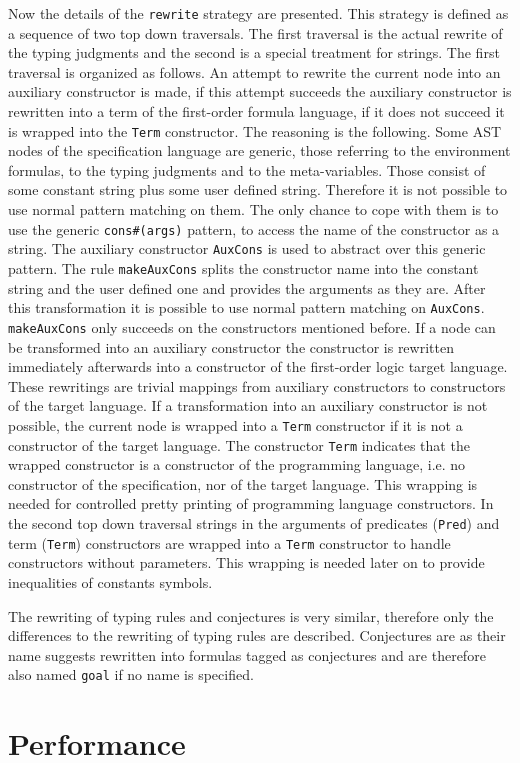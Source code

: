 Now the details of the \texttt{rewrite} strategy are presented. This
strategy is defined as a sequence of two top down traversals. The first
traversal is the actual rewrite of the typing judgments and the second
is a special treatment for strings. The first traversal is organized
as follows. An attempt to rewrite the current node into an auxiliary
constructor is made, if this attempt succeeds the auxiliary
constructor is rewritten into a term of the first-order formula
language, if it does not succeed it is wrapped into the \texttt{Term}
constructor. The reasoning is the following. Some AST nodes of the
specification language are generic, those referring to the environment
formulas, to the typing judgments and to the meta-variables. Those
consist of some constant string plus some user defined
string. Therefore it is not possible to use normal pattern matching on
them. The only chance to cope with them is to use the generic
\texttt{cons\#(args)} pattern, to access the name of the constructor
as a string. The auxiliary constructor \texttt{AuxCons} is used to
abstract over this generic pattern. The rule \texttt{makeAuxCons}
splits the constructor name into the constant string and the user
defined one and provides the arguments as they are. After this
transformation it is possible to use normal pattern matching on
\texttt{AuxCons}. \texttt{makeAuxCons} only succeeds on the
constructors mentioned before. If a node can be transformed into an
auxiliary constructor the constructor is rewritten immediately
afterwards into a constructor of the first-order logic target
language. These rewritings are trivial mappings from auxiliary
constructors to constructors of the target language. If a
transformation into an auxiliary constructor is not possible, the
current node is wrapped into a \texttt{Term} constructor if it is not
a constructor of the target language. The constructor \texttt{Term}
indicates that the wrapped constructor is a constructor of the
programming language, i.e. no constructor of the specification, nor of
the target language. This wrapping is needed for controlled pretty
printing of programming language constructors. In the second top down
traversal strings in the arguments of predicates (\texttt{Pred}) and
term (\texttt{Term}) constructors are wrapped into a \texttt{Term}
constructor to handle constructors without parameters. This wrapping
is needed later on to provide inequalities of constants symbols.

The rewriting of typing rules and conjectures is very similar,
therefore only the differences to the rewriting of typing rules are
described. Conjectures are as their name suggests rewritten into
formulas tagged as conjectures and are therefore also named
\texttt{goal} if no name is specified. 

\section{Performance}
